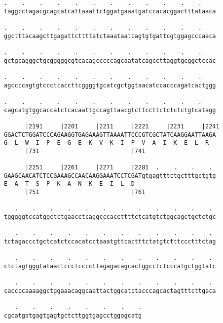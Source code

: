 \documentclass{article}
\begin{document}
\begin{Verbatim}
.    .    .    .    .    .    .    .    .    .    .    .    
taggcctagacgcagcatcattaaattctggatgaaatgatccacacggactttataaca
                                                            
.    .    .    .    .    .    .    .    .    .    .    .    
ggctttacaagcttgagattcttttatctaaataatcagtgtgattcgtggagcccaaca
                                                            
.    .    .    .    .    .    .    .    .    .    .    .    
gctgcagggctgcgggggcgtcacagcccccagcaatatcagccttaggtgcggctccac
                                                            
.    .    .    .    .    .    .    .    .    .    .    .    
agccccagtgtccctcaccttcggggtgcatcgctggtaacatccacccagatcactggg
                                                            
.    .    .    .    .    .    .    .    .    .    .    .    
cagcatgtggcaccatctcacaattgccagttaacgtcttccttctctctctgtcatagg
                                                            
      |2191     |2201     |2211     |2221     |2231     |2241
GGACTCTGGATCCCAGAAGGTGAGAAAGTTAAAATTCCCGTCGCTATCAAGGAATTAAGA
G  L  W  I  P  E  G  E  K  V  K  I  P  V  A  I  K  E  L  R  
      |731                          |741                    
  
      |2251     |2261     |2271     |2281  .    .    .    . 
GAAGCAACATCTCCGAAAGCCAACAAGGAAATCCTCGATgtgagtttctgctttgctgtg
E  A  T  S  P  K  A  N  K  E  I  L  D                       
      |751                          |761                    
  
   .    .    .    .    .    .    .    .    .    .    .    . 
tgggggtccatggctctgaacctcaggcccaccttttctcatgtctggcagctgctctgc
                                                            
   .    .    .    .    .    .    .    .    .    .    .    . 
tctagaccctgctcatctccacatcctaaatgttcactttctatgtctttccctttctag
                                                            
   .    .    .    .    .    .    .    .    .    .    .    . 
ctctagtgggtataactccctccccttagagacagcactggcctctcccatgctggtatc
                                                            
   .    .    .    .    .    .    .    .    .    .    .    . 
caccccaaaaggctggaaacaggcaattactggcatctacccagcactagtttcttgaca
                                                            
   .    .    .    .    .    .    .    .
cgcatgatgagtgagtgctcttggtgagcctggagcatg
                                       

\end{Verbatim}
\end{document}
